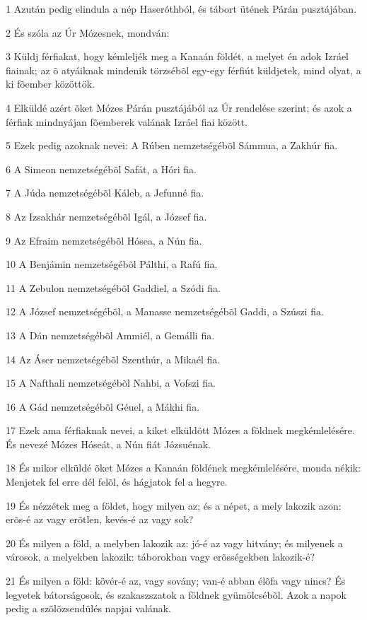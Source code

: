 \par 1 Azután pedig elindula a nép Haseróthból, és tábort ütének Párán pusztájában.
\par 2 És szóla az Úr Mózesnek, mondván:
\par 3 Küldj férfiakat, hogy kémleljék meg a Kanaán földét, a melyet én adok Izráel fiainak; az õ atyáiknak mindenik törzsébõl egy-egy férfiút küldjetek, mind olyat, a ki fõember közöttök.
\par 4 Elküldé azért õket Mózes Párán pusztájából az Úr rendelése szerint; és azok a férfiak mindnyájan fõemberek valának Izráel fiai között.
\par 5 Ezek pedig azoknak nevei: A Rúben nemzetségébõl Sámmua, a Zakhúr fia.
\par 6 A Simeon nemzetségébõl Safát, a Hóri fia.
\par 7 A Júda nemzetségébõl Káleb, a Jefunné fia.
\par 8 Az Izsakhár nemzetségébõl Igál, a József fia.
\par 9 Az Efraim nemzetségébõl Hósea, a Nún fia.
\par 10 A Benjámin nemzetségébõl Pálthi, a Rafú fia.
\par 11 A Zebulon nemzetségébõl Gaddiel, a Szódi fia.
\par 12 A József nemzetségébõl, a Manasse nemzetségébõl Gaddi, a Szúszi fia.
\par 13 A Dán nemzetségébõl Ammiél, a Gemálli fia.
\par 14 Az Áser nemzetségébõl Szenthúr, a Mikaél fia.
\par 15 A Nafthali nemzetségébõl Nahbi, a Vofszi fia.
\par 16 A Gád nemzetségébõl Géuel, a Mákhi fia.
\par 17 Ezek ama férfiaknak nevei, a kiket elküldött Mózes a földnek megkémlelésére. És nevezé Mózes Hóseát, a Nún fiát Józsuénak.
\par 18 És mikor elküldé õket Mózes a Kanaán földének megkémlelésére, monda nékik: Menjetek fel erre dél felõl, és hágjatok fel a hegyre.
\par 19 És nézzétek meg a földet, hogy milyen az; és a népet, a mely lakozik azon: erõs-é az vagy erõtlen, kevés-é az vagy sok?
\par 20 És milyen a föld, a melyben lakozik az: jó-é az vagy hitvány; és milyenek a városok, a melyekben lakozik: táborokban vagy erõsségekben lakozik-é?
\par 21 És milyen a föld: kövér-é az, vagy sovány; van-é abban élõfa vagy nincs? És legyetek bátorságosok, és szakaszszatok a földnek gyümölcsébõl. Azok a napok pedig a szõlõzsendülés napjai valának.
